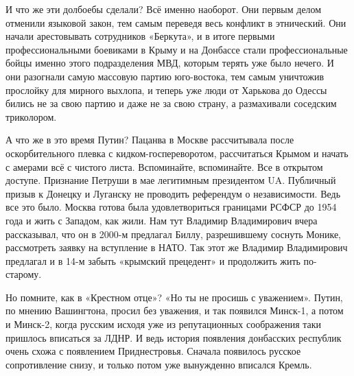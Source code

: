 И что же эти долбоебы сделали? Всё именно наоборот. Они первым делом отменили
языковой закон, тем самым переведя весь конфликт в этнический. Они начали
арестовывать сотрудников «Беркута», и в итоге первыми профессиональными
боевиками в Крыму и на Донбассе стали профессиональные бойцы именно этого
подразделения МВД, которым терять уже было нечего. И они разогнали самую
массовую партию юго-востока, тем самым уничтожив прослойку для мирного выхлопа,
и теперь уже люди от Харькова до Одессы бились не за свою партию и даже не за
свою страну, а размахивали соседским триколором.

А что же в это время Путин? Пацанва в Москве рассчитывала после оскорбительного
плевка с кидком-госпереворотом, рассчитаться Крымом и начать с амерами всё с
чистого листа. Вспоминайте, вспоминайте. Все в открытом доступе. Признание
Петруши в мае легитимным президентом UA. Публичный призыв к Донецку и Луганску
не проводить референдум о независимости. Ведь все это было. Москва готова была
удовлетвориться границами РСФСР до 1954 года и жить с Западом, как жили. Нам
тут Владимир Владимирович вчера рассказывал, что он в 2000-м предлагал Биллу,
разрешившему соснуть Монике, рассмотреть заявку на вступление в НАТО. Так этот
же Владимир Владимирович предлагал и в 14-м забыть «крымский прецедент» и
продолжить жить по-старому.

Но помните, как в «Крестном отце»? «Но ты не просишь с уважением». Путин, по
мнению Вашингтона, просил без уважения, и так появился Минск-1, а потом и
Минск-2, когда русским исходя уже из репутационных соображения таки пришлось
вписаться за ЛДНР. И ведь история появления донбасских республик очень схожа с
появлением Приднестровья. Сначала появилось русское сопротивление снизу, и
только потом уже вынужденно вписался Кремль.
